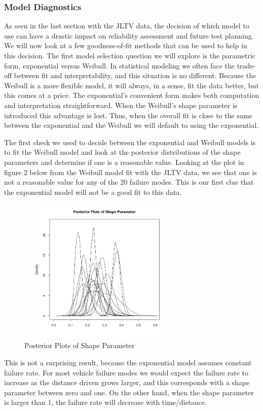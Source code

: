 \documentclass[12pt]{article}
\begin{document}
\subsubsection{Model Diagnostics}
As seen in the last section with the JLTV data, the decision of which model to
use can have a drastic impact on reliability assessment and future test
planning.  We will now look at a few  goodness-of-fit methods that can be used
to help in this decision.  The first model selection question we will explore is
the parametric form, exponential versus Weibull.  In statistical modeling we
often face the trade-off between fit and interpretability, and this situation is
no different. Because the Weibull is a more flexible model, it will always, in a
sense, fit the data better, but this comes at a price.  The exponential's
convenient form makes both computation and interpretation straightforward.  When
the Weibull's shape parameter is introduced this advantage is lost.  Thus, when
the overall fit is close to the same between the exponential and the Weibull we
will default to using the exponential.

The first check we used to decide between the exponential and Weibull models is
to fit the Weibull model and look at the posterior distributions of the shape
parameters and determine if one is a reasonable value.  Looking at the plot in
figure 2 below from the Weibull model fit with the JLTV data, we see that one is
not a reasonable value for any of the 20 failure modes.  This is our first clue
that the exponential model will not be a good fit to this data.

\begin{figure}[h]
  \centering
      \includegraphics[width=8cm, height=7cm]{shapePostPlot}
  \caption{Posterior Plots of Shape Parameter}
\end{figure}

This is not a surprising result, because the exponential model assumes constant
failure rate.  For most vehicle failure modes we would expect the failure rate to
increase as the distance driven grows larger, and this corresponds with a shape
parameter between zero and one.  On the other hand, when the shape parameter is
larger than 1, the failure rate will decrease with time/distance.
\end{document}
